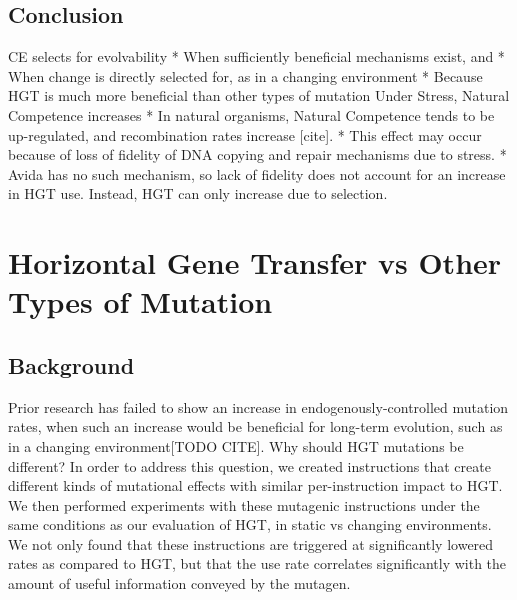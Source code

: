 \documentclass[PhD]{msu-thesis}
\begin{document}
\section{Conclusion}
CE selects for evolvability 
* When sufficiently beneficial mechanisms exist, and 
* When change is directly selected for, as in a changing environment
* Because HGT is much more beneficial than other types of mutation
Under Stress, Natural Competence increases
* In natural organisms, Natural Competence tends to be up-regulated, and recombination rates increase [cite]. 
* This effect may occur because of loss of fidelity of DNA copying and repair mechanisms due to stress. 
* Avida has no such mechanism, so lack of fidelity does not account for an increase in HGT use. Instead, HGT can only increase due to selection. 




\chapter{Horizontal Gene Transfer vs Other Types of Mutation}
\label{chap:hgt-preferred}
\section{Background}

Prior research has failed to show an increase in endogenously-controlled mutation rates, when such an increase would be beneficial for long-term evolution, such as in a changing environment[TODO CITE]. Why should HGT mutations be different? In order to address this question, we created instructions that create different kinds of mutational effects with similar per-instruction impact to HGT. We then performed experiments with these mutagenic instructions under the same conditions as our evaluation of HGT, in static vs changing environments. We not only found that these instructions are triggered at significantly lowered rates as compared to HGT, but that the use rate correlates significantly with the amount of useful information conveyed by the mutagen. 
\end{document}
